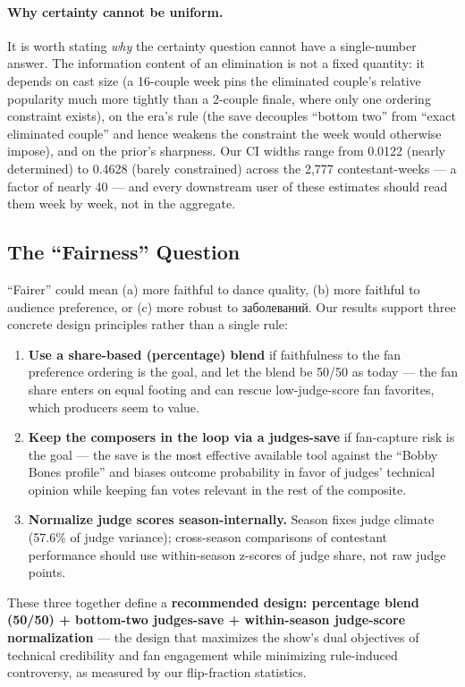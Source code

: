 \documentclass{article}
\begin{document}
\paragraph{Why certainty cannot be uniform.} It is worth stating \emph{why} the certainty question cannot have a single-number answer. The information content of an elimination is not a fixed quantity: it depends on cast size (a 16-couple week pins the eliminated couple's relative popularity much more tightly than a 2-couple finale, where only one ordering constraint exists), on the era's rule (the save decouples ``bottom two'' from ``exact eliminated couple'' and hence weakens the constraint the week would otherwise impose), and on the prior's sharpness. Our CI widths range from 0.0122 (nearly determined) to 0.4628 (barely constrained) across the 2{,}777 contestant-weeks --- a factor of nearly 40 --- and every downstream user of these estimates should read them week by week, not in the aggregate.

\subsection{The ``Fairness'' Question}

``Fairer'' could mean (a) more faithful to dance quality, (b) more faithful to audience preference, or (c) more robust to заболеваний. Our results support three concrete design principles rather than a single rule:
\begin{enumerate}
  \item \textbf{Use a share-based (percentage) blend} if faithfulness to the fan preference ordering is the goal, and let the blend be 50/50 as today --- the fan share enters on equal footing and can rescue low-judge-score fan favorites, which producers seem to value.
  \item \textbf{Keep the composers in the loop via a judges-save} if fan-capture risk is the goal --- the save is the most effective available tool against the ``Bobby Bones profile'' and biases outcome probability in favor of judges' technical opinion while keeping fan votes relevant in the rest of the composite.
  \item \textbf{Normalize judge scores season-internally.} Season fixes judge climate (57.6\% of judge variance); cross-season comparisons of contestant performance should use within-season z-scores of judge share, not raw judge points.
\end{enumerate}
These three together define a \textbf{recommended design: percentage blend (50/50) + bottom-two judges-save + within-season judge-score normalization} --- the design that maximizes the show's dual objectives of technical credibility and fan engagement while minimizing rule-induced controversy, as measured by our flip-fraction statistics.
\end{document}
